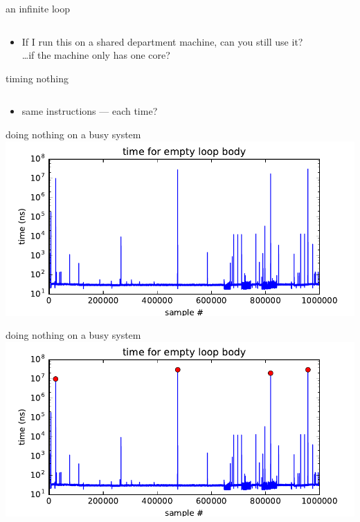 \begin{frame}{an infinite loop}
\inputminted{C}{../exceptions/loop.c}
\begin{itemize}
\item If I run this on a shared department machine, can you still use it? \\
\ldots if the machine only has one core?
\end{itemize}
\end{frame}

\begin{frame}{timing nothing}
    \inputminted[firstline=18]{C}{../exceptions/timedloop.c}
\begin{itemize}
\item same instructions ---  each time?
\end{itemize}
\end{frame}

\begin{frame}{doing nothing on a busy system}
\includegraphics[width=\textwidth]{../exceptions/empty-samples}
\end{frame}

\begin{frame}{doing nothing on a busy system}
\includegraphics[width=\textwidth]{../exceptions/empty-samples-big-marked}
\end{frame}

